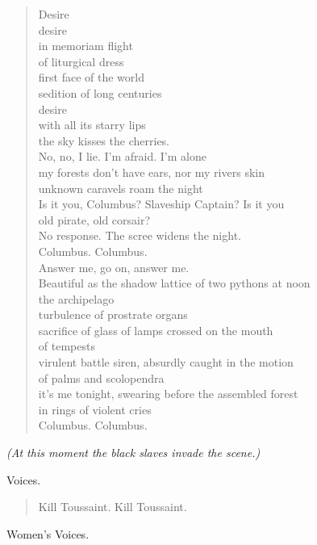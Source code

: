 \documentclass[letterpaper,article,12pt,oneside,notitlepage]{memoir}
\begin{document}
\begin{verse}
Desire \\
desire \\
in memoriam flight \\
of liturgical dress \\
first face of the world \\
sedition of long centuries \\
desire \\
with all its starry lips \\
the sky kisses the cherries. \\
No, no, I lie. I'm afraid. I'm alone \\
my forests don't have ears, nor my rivers skin \\
unknown caravels roam the night \\
Is it you, Columbus? Slaveship Captain? Is it you \\
old pirate, old corsair? \\
No response. The scree widens the night. \\
Columbus. Columbus. \\
Answer me, go on, answer me. \\
Beautiful as the shadow lattice of two pythons at noon \\
the archipelago \\
turbulence of prostrate organs \\
sacrifice of glass of lamps crossed on the mouth \\
of tempests \\
virulent battle siren, absurdly caught in the motion \\
of palms and scolopendra \\
it's me tonight, swearing before the assembled forest \\
in rings of violent cries \\
Columbus. Columbus. \\
\end{verse}

\textit{(At this moment the black slaves invade the scene.)}

\begin{center}Voices.\end{center}

\begin{verse}
Kill Toussaint. Kill Toussaint. \\
\end{verse}

\begin{center}Women's Voices.\end{center}
\end{document}
